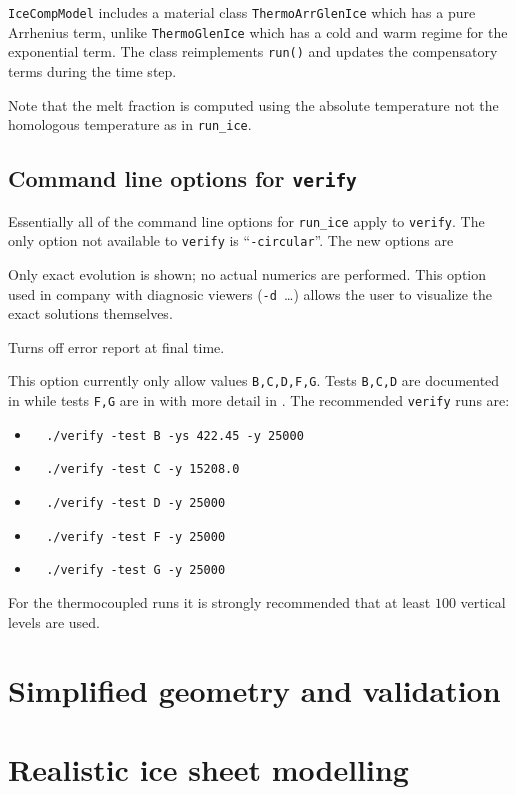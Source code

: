 \documentclass[11pt,final]{amsart}
\renewcommand{\t}[1]{\texttt{#1}}
\begin{document}
\t{IceCompModel} includes a material class \t{ThermoArrGlenIce} which has a pure Arrhenius term, unlike \t{ThermoGlenIce} which has a cold and warm regime for the exponential term.  The class reimplements \t{run()} and updates the compensatory terms during the time step.

Note that the melt fraction is computed using the absolute temperature not the homologous temperature as in \verb|run_ice|.

\subsection{Command line options for \t{verify}}  Essentially all of the command line options for \verb|run_ice| apply to \t{verify}.  The only option not available to \t{verify} is ``\t{-circular}''.  The new options are

  Only exact evolution is shown; no actual numerics are performed.  This option used in company with diagnosic viewers (\verb|-d |\dots) allows the user to visualize the exact solutions themselves.

  Turns off error report at final time.

  This option currently only allow values \t{B,C,D,F,G}.  Tests \t{B,C,D} are documented in \cite{BLKCB} while tests \t{F,G} are in \cite{BBL} with more detail in \cite{BB}.  The recommended \t{verify} runs are:\begin{itemize}
\item \verb|  ./verify -test B -ys 422.45 -y 25000|
\item \verb|  ./verify -test C -y 15208.0|
\item \verb|  ./verify -test D -y 25000|
\item \verb|  ./verify -test F -y 25000|
\item \verb|  ./verify -test G -y 25000|
\end{itemize}
For the thermocoupled runs it is strongly recommended that at least $100$ vertical levels are used.



\section{Simplified geometry and validation}


\section{Realistic ice sheet modelling}
\end{document}
